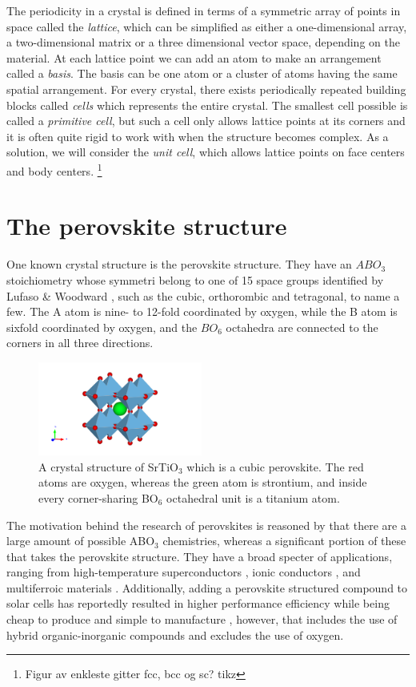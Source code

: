 The periodicity in a crystal is defined in terms of a symmetric array of points in space called the \textit{lattice}, which can be simplified as either a one-dimensional array, a two-dimensional matrix or a three dimensional vector space, depending on the material. At each lattice point we can add an atom to make an arrangement called a \textit{basis}. The basis can be one atom or a cluster of atoms having the same spatial arrangement. For every crystal, there exists periodically repeated building blocks called \textit{cells} which represents the entire crystal. The smallest cell possible is called a \textit{primitive cell}, but such a cell only allows lattice points at its corners and it is often quite rigid to work with when the structure becomes complex. As a solution, we will consider the \textit{unit cell}, which allows lattice points on face centers and body centers. \footnote{Figur av enkleste gitter fcc, bcc og sc? tikz}

\section{The perovskite structure}

One known crystal structure is the perovskite structure. They have an $ABO_3$ stoichiometry whose symmetri belong to one of 15 space groups identified by Lufaso \& Woodward \cite{Lufaso2001}, such as the cubic, orthorombic and tetragonal, to name a few. The A atom is nine- to 12-fold coordinated by oxygen, while the B atom is sixfold coordinated by oxygen, and the $BO_6$ octahedra are connected to the corners in all three directions.

\begin{figure}
  \centering
  \includegraphics[width=0.48\textwidth]{theory/figures/SrTiO3_mp-5229_primitive.pdf}
  \caption{A crystal structure of SrTiO$_3$ which is a cubic perovskite. The red atoms are oxygen, whereas the green atom is strontium, and inside every corner-sharing BO$_6$ octahedral unit is a titanium atom.}
  \label{fig:pic}
\end{figure}

The motivation behind the research of perovskites is reasoned by that there are a large amount of possible ABO$_3$ chemistries, whereas a significant portion of these that takes the perovskite structure. They have a broad specter of applications, ranging from high-temperature superconductors \cite{Bednorz1988}, ionic conductors \cite{Boivin1998}, and  multiferroic materials \cite{Cheong2007}. Additionally, adding a perovskite structured compound to solar cells has reportedly resulted in higher performance efficiency while being cheap to produce and simple to manufacture \cite{IbnMohammed2017, Chen2014}, however, that includes the use of hybrid organic-inorganic compounds and excludes the use of oxygen.

